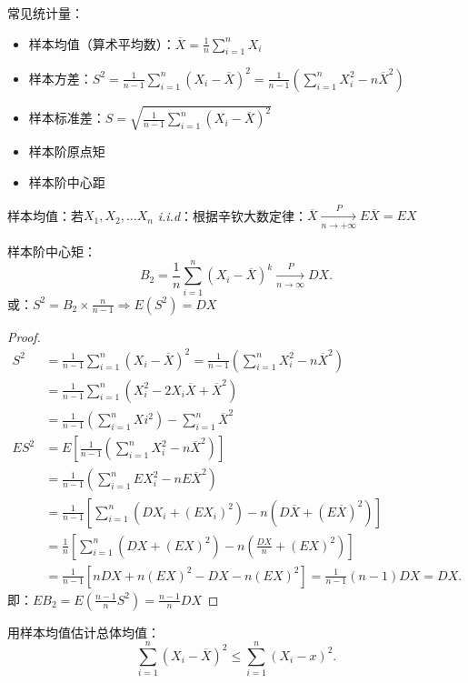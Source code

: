 常见统计量：
\begin{itemize}
    \item 样本均值（算术平均数）：$\overline{X}=\frac{1}{n} \sum_{i=1}^{n} X_{i}$
    \item 样本方差：$S^2=\frac{1}{n-1} \sum_{i=1}^{n} \left( X_{i}-\overline{X} \right) ^2=\frac{1}{n-1} \left( \sum_{i=1}^{n} X_{i}^2-n\overline{X}^2 \right) $
    \item 样本标准差：$S=\sqrt{\frac{1}{n-1} \sum_{i=1}^{n} \left( X_{i}-\overline{X} \right) ^2} $
    \item 样本阶原点矩
    \item 样本阶中心距
\end{itemize}
\begin{notation}
    样本均值：若$X_1,X_2,\ldots X_{n}$ \textit{i.i.d}：根据辛钦大数定律：$\overline{X}\xrightarrow[n \to +\infty]{P} E\overline{X}=EX$
\end{notation}
\begin{notation}
    样本阶中心矩：
     \[
        B_2=\frac{1}{n} \sum_{i=1}^{n} \left( X_{i}-\overline{X} \right) ^{k}\xrightarrow[n\to \infty]{P} DX
    .\] 
    或：$S^2=B_2\times \frac{n}{n-1} \Rightarrow E\left( S^2 \right) =DX$
\end{notation}
\begin{proof}
    \begin{align*}
        S^2&=\frac{1}{n-1} \sum_{i=1}^{n} \left( X_{i}-\overline{X} \right) ^2=\frac{1}{n-1} \left( \sum_{i=1}^{n} X_{i}^2-n\overline{X}^2 \right) \\
        &= \frac{1}{n-1} \sum_{i=1}^{n} \left( X_{i}^2-2X_{i}\overline{X}+\overline{X}^2 \right) \\
        &= \frac{1}{n-1} \left( \sum_{i=1}^{n} Xi^2 \right) -\sum_{i=1}^{n} \overline{X}^2 \\
        ES^2&= E\left[ \frac{1}{n-1} \left( \sum_{i=1}^{n} X_{i}^2-n\overline{X}^2 \right)  \right]  \\
        &= \frac{1}{n-1} \left( \sum_{i=1}^{n} EX_{i}^2-nE\overline{X}^2 \right)  \\
        &= \frac{1}{n-1} \left[ \sum_{i=1}^{n} \left( DX_{i}+\left( EX_{i} \right) ^2 \right) -n\left( D\overline{X}+\left( E\overline{X} \right) ^2   \right)  \right]  \\
        &= \frac{1}{n} \left[ \sum_{i=1}^{n} \left( DX+\left( EX \right) ^2 \right) -n\left( \frac{DX}{n} +\left( EX \right) ^2 \right)  \right]  \\
        &= \frac{1}{n-1} \left[ nDX+n\left( EX \right) ^2-DX-n\left( EX \right) ^2 \right] =\frac{1}{n-1} \left( n-1 \right) DX =DX
    .\end{align*}
    即：$EB_2=E\left( \frac{n-1}{n} S^2 \right) =\frac{n-1}{n}DX $
\end{proof}
用样本均值估计总体均值：
\[
    \sum_{i=1}^{n} \left( X_{i}-\overline{X} \right) ^2\le \sum_{i=1}^{n} \left( X_{i}-x \right) ^2
.\] 
